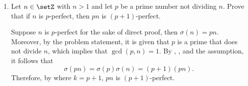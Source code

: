 \begin{enumerate}
\begin{enumerate}
\begin{subanswer}
\begin{enumerate}
\begin{itemize}
          \item $k=4$: $2^4+4=20$. This is not a divisor of 36. (\textbf{Not a solution})
          \item $k=5$: $2^5+4=36$. $p = 8 - \frac{36}{36} = 8-1=7$. This is an odd prime. $n = 2^5 \cdot 3 \cdot 7 = 672$. (\textbf{Solution})
          \item $k>5$: $2^k+4 > 36$. This is not a divisor of 36. (\textbf{No solutions})
        \end{itemize}
      \end{enumerate}
      Therefore, the two $3$-perfect numbers of the specified form are $120$ and $672$.
    \end{subanswer}

    \item Let $n \in \setZ$ with $n>1$ and let $p$ be a prime number not dividing $n$. Prove that if $n$ is $p$-perfect, then $p n$ is $(p+1)$-perfect.
    \begin{subprove}
      Suppose $n$ is $p$-perfect for the sake of direct proof, then $\sigma(n) = pn$.
      Moreover, by the problem statement, it is given that $p$ is a prime that does not divide $n$, which implies that $\gcd(p, n) = 1$.
      By , , and the assumption, it follows that
      \[
      \sigma(pn) = \sigma(p) \sigma(n) = (p+1) (pn).
      \]
      Therefore, by  where $k=p+1$, $pn$ is $(p+1)$-perfect.
    \end{subprove}
  \end{enumerate}


















  \newpage



\end{enumerate}
